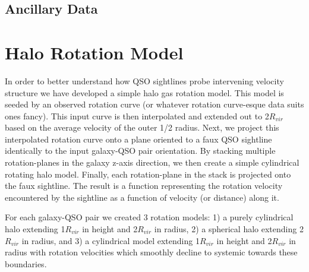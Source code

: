 \documentclass[iop]{emulateapj-rtx4}
\begin{document}
\subsection{Ancillary Data}

\section{Halo Rotation Model}
In order to better understand how QSO sightlines probe intervening velocity structure we have developed a simple halo gas rotation model. This model is seeded by an observed rotation curve (or whatever rotation curve-esque data suits ones fancy). This input curve is then interpolated and extended out to 2$R_{vir}$ based on the average velocity of the outer 1/2 radius. Next, we project this interpolated rotation curve onto a plane oriented to a faux QSO sightline identically to the input galaxy-QSO pair orientation. By stacking multiple rotation-planes in the galaxy z-axis direction, we then create a simple cylindrical rotating halo model. Finally, each rotation-plane in the stack is projected onto the faux sightline. The result is a function representing the rotation velocity encountered by the sightline as a function of velocity (or distance) along it.

For each galaxy-QSO pair we created 3 rotation models: 1) a purely cylindrical halo extending 1$R_{vir}$ in height and 2$R_{vir}$ in radius, 2) a spherical halo extending 2$R_{vir}$ in radius, and 3) a cylindrical model extending 1$R_{vir}$ in height and 2$R_{vir}$ in radius with rotation velocities which smoothly decline to systemic towards these boundaries.



\end{document}
